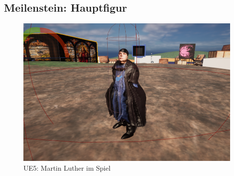 \documentclass[10pt,a4paper,bibliography=totocnumbered,listof=totocnumbered]{scrartcl}
\begin{document}
\subsection {Meilenstein: Hauptfigur}
\begin{figure}
	 \centering
	\includegraphics[width=14cm]{BilderFuerBA/Screenshot/MartinLutherImSpiel.png}
	\caption{UE5: Martin Luther im Spiel}
	\label{MartinLutherImSpiel}
\end{figure}
\end{document}
